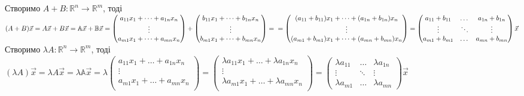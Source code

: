 \documentclass[a4paper, 10pt]{article}
\theoremstyle{theoremdd}
\begin{document}
	Створимо $A+B: \mathbb{R}^n \to \mathbb{R}^m$, тоді\\
	$(A+B)\vec{x} = A \vec{x} + B \vec{x} = \mathbb{A} \vec{x} + \mathbb{B} \vec{x} = \begin{pmatrix}
	a_{11}x_1 + \dots + a_{1n} x_n \\
	\vdots \\
	a_{m1}x_1 + \dots + a_{mn} x_n \\
	\end{pmatrix} + \begin{pmatrix}
	b_{11}x_1 + \dots + b_{1n} x_n \\
	\vdots \\
	b_{m1}x_1 + \dots + b_{mn} x_n \\
	\end{pmatrix} = \\
	= \begin{pmatrix}
	(a_{11}+b_{11})x_1 + \dots + (a_{1n}+b_{1n}) x_n \\
	\vdots \\
	(a_{m1} + b_{m1})x_1 + \dots + (a_{mn}+b_{mn}) x_n \\
	\end{pmatrix} = \begin{pmatrix}
	a_{11} + b_{11} & \dots & a_{1n} + b_{1n} \\
	\vdots & \ddots & \vdots \\
	a_{m1} + b_{m1} & \dots & a_{mn} + b_{mn}
	\end{pmatrix} \vec{x}$
	\bigskip \\
	Створимо $\lambda A: \mathbb{R}^n \to \mathbb{R}^m$, тоді\\
	$(\lambda A)\vec{x} = \lambda A \vec{x} = \lambda \mathbb{A} \vec{x} = \lambda \begin{pmatrix}
	a_{11}x_1 + \dots + a_{1n} x_n \\
	\vdots \\
	a_{m1}x_1 + \dots + a_{mn} x_n \\
	\end{pmatrix}
	= \begin{pmatrix}
	\lambda a_{11}x_1 + \dots + \lambda a_{1n} x_n \\
	\vdots \\
	\lambda a_{m1} x_1 + \dots + \lambda a_{mn} x_n \\
	\end{pmatrix} = \begin{pmatrix}
	\lambda a_{11} & \dots & \lambda a_{1n}\\
	\vdots & \ddots & \vdots \\
	\lambda a_{m1} & \dots & \lambda a_{mn}
	\end{pmatrix} \vec{x}$
\end{document}
